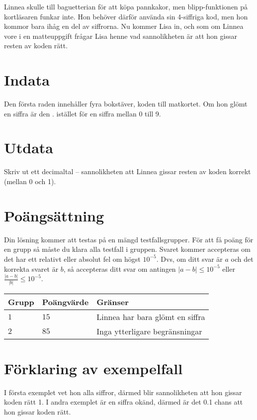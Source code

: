 Linnea skulle till baguetterian för att köpa pannkakor, men blipp-funktionen på kortläsaren funkar inte.
Hon behöver därför använda sin 4-siffriga kod, men hon kommor bara ihåg en del av siffrorna.
Nu kommer Lisa in, och som om Linnea vore i en matteuppgift frågar Lisa henne vad sannolikheten är att hon gissar resten av koden rätt.   


\section*{Indata}
Den första raden innehåller fyra bokstäver, koden till matkortet. Om hon glömt en siffra är den . istället för en siffra mellan 0 till 9.

\section*{Utdata}
Skriv ut ett decimaltal -- sannolikheten att Linnea gissar resten av koden korrekt (mellan 0 och 1).

\section*{Poängsättning}
Din lösning kommer att testas på en mängd testfallsgrupper.
För att få poäng för en grupp så måste du klara alla testfall i gruppen.
Svaret kommer accepteras om det har ett relativt eller absolut fel om högst $10^{-5}$.
Dvs, om ditt svar är $a$ och det korrekta svaret är $b$, så accepteras ditt svar om
antingen $|a-b| \le 10^{-5}$ eller $\frac{|a-b|}{|b|} \le 10^{-5}$.

\noindent
\begin{tabular}{| l | l | p{12cm} |}
  \hline
  Grupp & Poängvärde & Gränser \\ \hline
  $1$   & $15$       & Linnea har bara glömt en siffra \\ \hline
  $2$   & $85$       & Inga ytterligare begränsningar  \\ \hline
\end{tabular}

\section*{Förklaring av exempelfall}
I första exemplet vet hon alla siffror, därmed blir sannolikheten att hon gissar koden rätt 1.
I andra exemplet är en siffra okänd, därmed är det 0.1 chans att hon gissar koden rätt.